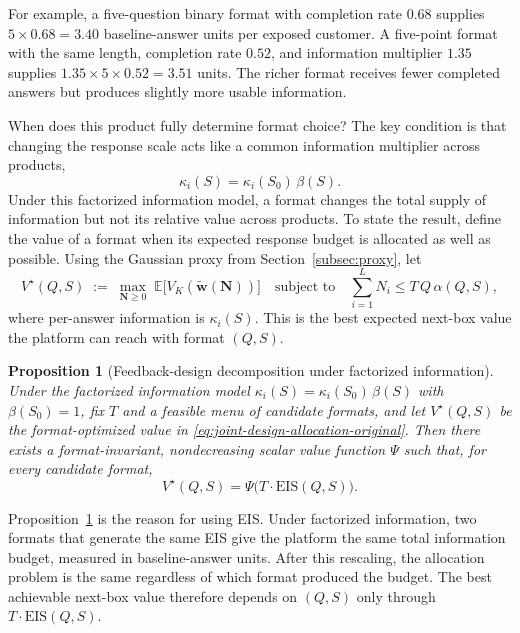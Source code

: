\documentclass[11pt]{article}
\newtheorem{proposition}[theorem]{Proposition}
\theoremstyle{definition}
\theoremstyle{remark}
\newcommand{\E}{\mathbb{E}}
\newcommand{\1}{\mathbf{1}}
\newcommand{\w}{\mathbf{w}}
\newcommand{\N}{\mathbf{N}}
\begin{document}
For example, a five-question binary format with completion rate \(0.68\)
supplies \(5\times0.68=3.40\) baseline-answer units per exposed customer.
A five-point format with the same length, completion rate \(0.52\), and
information multiplier \(1.35\) supplies
\(1.35\times5\times0.52=3.51\) units. The richer format receives fewer
completed answers but produces slightly more usable information.

When does this product fully determine format choice? The key condition
is that changing the response scale acts like a common information multiplier across products,
\[
\kappa_i(S)=\kappa_i(S_0)\,\beta(S).
\]
Under this factorized information model, a format changes the total
supply of information but not its relative value across products. To
state the result, define the value of a format when its expected response
budget is allocated as well as possible. Using the Gaussian proxy from
Section~\ref{subsec:proxy}, let
\begin{equation}
\label{eq:joint-design-allocation-original}
V^\star(Q,S)
\;:=\;
\max_{\N\ge0}\;
\E\!\big[V_K(\tilde{\w}(\N))\big]
\quad\text{subject to}\quad
\sum_{i=1}^L N_i\le T\,Q\,\alpha(Q,S),
\end{equation}
where per-answer information is \(\kappa_i(S)\). This is the best
expected next-box value the platform can reach with format \((Q,S)\).

\begin{proposition}[Feedback-design decomposition under factorized information]
\label{prop:eis-equivalence}
Under the factorized information model
$\kappa_i(S)=\kappa_i(S_0)\,\beta(S)$ with \(\beta(S_0)=1\), fix $T$ and
a feasible menu of candidate formats, and let $V^\star(Q,S)$ be the
format-optimized value in \eqref{eq:joint-design-allocation-original}. Then there exists a
format-invariant, nondecreasing scalar value function \(\Psi\) such that,
for every candidate format,
\[
V^\star(Q,S)=\Psi\!\big(T\cdot \mathrm{EIS}(Q,S)\big).
\]
\end{proposition}

Proposition~\ref{prop:eis-equivalence} is the reason for using EIS.
Under factorized information, two formats that generate the same EIS
give the platform the same total information budget, measured in
baseline-answer units. After this rescaling, the allocation problem is
the same regardless of which format produced the budget. The best
achievable next-box value therefore depends on \((Q,S)\) only through
\(T\cdot\mathrm{EIS}(Q,S)\).
\end{document}
